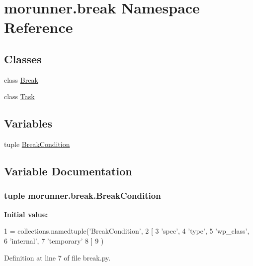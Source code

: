 \hypertarget{namespacemorunner_1_1break}{}\section{morunner.\+break Namespace Reference}
\label{namespacemorunner_1_1break}
\subsection*{Classes}
\begin{DoxyCompactItemize}
\item 
class \hyperlink{classmorunner_1_1break_1_1Break}{Break}
\item 
class \hyperlink{classmorunner_1_1break_1_1Task}{Task}
\end{DoxyCompactItemize}
\subsection*{Variables}
\begin{DoxyCompactItemize}
\item 
tuple \hyperlink{namespacemorunner_1_1break_a8ae952471ddccae191c37b56975d1f77}{Break\+Condition}
\end{DoxyCompactItemize}


\subsection{Variable Documentation}
\hypertarget{namespacemorunner_1_1break_a8ae952471ddccae191c37b56975d1f77}{}
\subsubsection[{Break\+Condition}]{\setlength{\rightskip}{0pt plus 5cm}tuple morunner.\+break.\+Break\+Condition}\label{namespacemorunner_1_1break_a8ae952471ddccae191c37b56975d1f77}
{\bfseries Initial value\+:}
\begin{DoxyCode}
1 = collections.namedtuple(\textcolor{stringliteral}{'BreakCondition'},
2                                         [
3                                          \textcolor{stringliteral}{'spec'},
4                                          \textcolor{stringliteral}{'type'},
5                                          \textcolor{stringliteral}{'wp\_class'},
6                                          \textcolor{stringliteral}{'internal'},
7                                          \textcolor{stringliteral}{'temporary'}
8                                         ]
9                                        )
\end{DoxyCode}


Definition at line 7 of file break.\+py.

